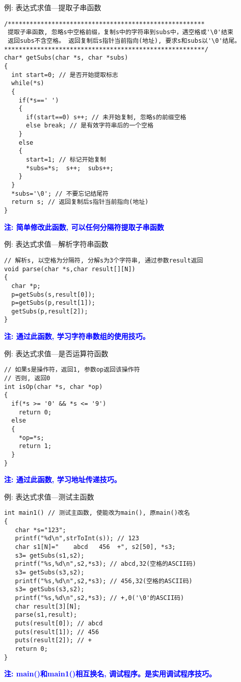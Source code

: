\begin{frame}{例: 表达式求值---提取子串函数}
\begin{lstlisting}
/******************************************************
 提取子串函数, 忽略s中空格前缀，复制s中的字符串到subs中，遇空格或'\0'结束
 返回subs不含空格。 返回复制后s指针当前指向(地址), 要求s和subs以'\0'结尾。
*******************************************************/ 
char* getSubs(char *s, char *subs) 
{
  int start=0; // 是否开始提取标志
  while(*s)
  {
    if(*s==' ') 
    {
      if(start==0) s++; // 未开始复制, 忽略s的前缀空格 
      else break; // 是有效字符串后的一个空格 
    }
    else
    {
      start=1; // 标记开始复制 
      *subs=*s;  s++;  subs++;
    }
  }
  *subs='\0'; // 不要忘记结尾符 
  return s; // 返回复制后s指针当前指向(地址)
}
\end{lstlisting}
\textbf{\textcolor{blue}{注: 简单修改此函数, 可以任何分隔符提取子串函数}}
\end{frame}

\begin{frame}{例: 表达式求值---解析字符串函数}
\begin{lstlisting}
// 解析s, 以空格为分隔符, 分解s为3个字符串, 通过参数result返回
void parse(char *s,char result[][N])
{
  char *p;
  p=getSubs(s,result[0]);
  p=getSubs(p,result[1]);
  getSubs(p,result[2]);
} 
\end{lstlisting}
\textbf{\textcolor{blue}{注: 通过此函数, 学习字符串数组的使用技巧。}}
\end{frame}

\begin{frame}{例: 表达式求值---是否运算符函数}
\begin{lstlisting}
// 如果s是操作符，返回1, 参数op返回该操作符
// 否则, 返回0 
int isOp(char *s, char *op)
{
  if(*s >= '0' && *s <= '9') 
    return 0;
  else
  {
    *op=*s;
    return 1;
  }
} 
\end{lstlisting}
\textbf{\textcolor{blue}{注: 通过此函数, 学习地址传递技巧。}}
\end{frame}

\begin{frame}{例: 表达式求值---测试主函数}
\begin{lstlisting}
int main1() // 测试主函数, 使能改为main(), 原main()改名
{
   char *s="123";
   printf("%d\n",strToInt(s)); // 123
   char s1[N]="    abcd   456  +", s2[50], *s3;
   s3= getSubs(s1,s2);
   printf("%s,%d\n",s2,*s3); // abcd,32(空格的ASCII码) 
   s3= getSubs(s3,s2);
   printf("%s,%d\n",s2,*s3); // 456,32(空格的ASCII码) 
   s3= getSubs(s3,s2);  
   printf("%s,%d\n",s2,*s3); // +,0('\0'的ASCII码)
   char result[3][N];
   parse(s1,result);
   puts(result[0]); // abcd
   puts(result[1]); // 456
   puts(result[2]); // +
   return 0;
}
\end{lstlisting}
\textbf{\textcolor{blue}{注: main()和main1()相互换名, 调试程序。是实用调试程序技巧。}}
\end{frame}

